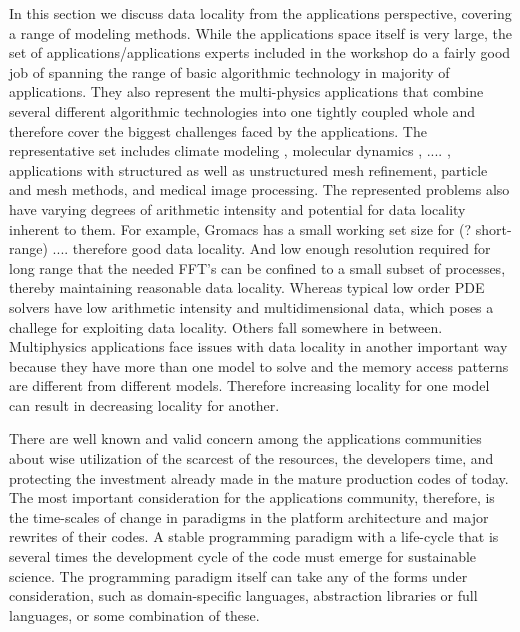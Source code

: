 In this section we discuss data locality from the applications perspective, covering a range of modeling methods.
While the applications space itself is very large, the set of applications/applications experts included in the workshop do a fairly good job of spanning the range of basic algorithmic technology in majority of applications.
They also represent the multi-physics applications that combine several different algorithmic technologies into one tightly coupled whole and therefore cover the biggest challenges faced by the applications.
The representative set includes climate modeling \cite{cosmo},  molecular dynamics \cite{gromacs}, .... , applications with structured \cite{chombo} as well as unstructured \cite{}  mesh refinement, particle and mesh methods, and medical image processing.
The represented problems also have varying degrees of arithmetic intensity and potential for data locality inherent to them.
For example, Gromacs has a small working set size for (? short-range) .... therefore good data locality.
And low enough resolution required for long range that the needed FFT's can be confined to a small subset of processes, thereby maintaining reasonable data locality.
Whereas typical low order PDE solvers have low arithmetic intensity and multidimensional data, which poses a challege for exploiting data locality.
Others fall somewhere in between.
Multiphysics applications face issues with data locality in another important way because they have more than one model to solve and the memory access patterns are different from different models.
Therefore increasing locality for one model can result in decreasing locality for another. 

There are well known and valid concern among the applications communities about wise utilization of the scarcest of the resources, the developers time, and protecting the investment already made in the mature production codes of today.
The most important consideration for the applications community, therefore, is the time-scales of change in paradigms in the platform architecture and major rewrites of their codes.
A stable programming paradigm with a life-cycle that is several times the development cycle of the code must emerge for sustainable science.
The programming paradigm itself can take any of the forms under consideration, such as domain-specific languages, abstraction libraries or full languages, or some combination of these. 
 
